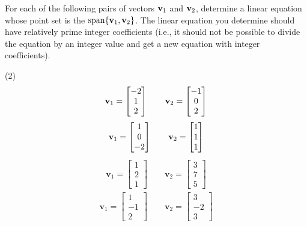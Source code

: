 For each of the following pairs of vectors $\mathbf v_1$ and $\mathbf v_2$,
determine a linear equation whose point set is the $\operatorname{\mathrm{span}}\{\mathbf v_1,
\mathbf v_2\}$.  The linear equation you determine should have relatively
prime integer coefficients (i.e., it should not be possible to divide
the equation by an integer value and get a new equation with integer
coefficients).
\begin{tasks}[resume, style=enumerate](2)
\task
  \begin{align*}
    \mathbf v_{1} = \begin{bmatrix} -2 \\ 1 \\ 2 \end{bmatrix}
    \qquad
    \mathbf v_{2} = \begin{bmatrix} -1 \\ 0 \\ 2 \end{bmatrix}
  \end{align*}
\task
  \begin{align*}
    \mathbf v_1 = \begin{bmatrix} 1 \\ 0 \\ -2 \end{bmatrix}
    \qquad
    \mathbf v_2 = \begin{bmatrix} 1 \\ 1 \\ 1 \end{bmatrix}
  \end{align*}
\task
  \begin{align*}
    \mathbf v_1 = \begin{bmatrix} 1 \\ 2 \\ 1 \end{bmatrix}
    \qquad
    \mathbf v_2 = \begin{bmatrix} 3 \\ 7 \\ 5 \end{bmatrix}
  \end{align*}
\task
  \begin{align*}
    \mathbf v_1 = \begin{bmatrix} 1 \\ -1 \\ 2 \end{bmatrix}
    \qquad
    \mathbf v_2 = \begin{bmatrix} 3 \\ -2 \\ 3 \end{bmatrix}
  \end{align*}
\end{tasks}

